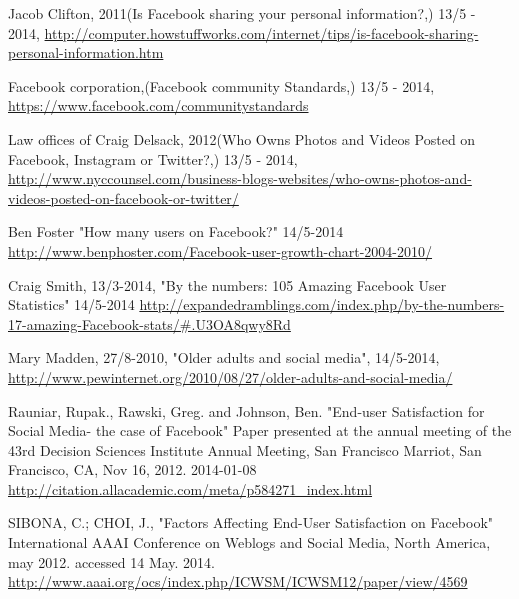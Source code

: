 \documentclass[conference]{IEEEtran}
\begin{document}
\begin{thebibliography}{1}
Jacob Clifton, 2011(Is Facebook sharing your personal information?,) 13/5 - 2014, \href{http://computer.howstuffworks.com/internet/tips/is-facebook-sharing-personal-information.htm}{http://computer.howstuffworks.com/internet/tips/is-facebook-sharing-personal-information.htm}

Facebook corporation,(Facebook community Standards,) 13/5 - 2014, \href{https://www.facebook.com/communitystandards}{https://www.facebook.com/communitystandards}

Law offices of Craig Delsack,
2012(Who Owns Photos and Videos Posted on Facebook, Instagram or Twitter?,) 13/5 - 2014, \href{http://www.nyccounsel.com/business-blogs-websites/who-owns-photos-and-videos-posted-on-facebook-or-twitter/}{http://www.nyccounsel.com/business-blogs-websites/who-owns-photos-and-videos-posted-on-facebook-or-twitter/}




Ben Foster
"How many users on Facebook?"
14/5-2014
\href{http://www.benphoster.com/Facebook-user-growth-chart-2004-2010/}{http://www.benphoster.com/Facebook-user-growth-chart-2004-2010/}

Craig Smith,
13/3-2014,
"By the numbers: 105 Amazing Facebook User Statistics"
14/5-2014
\href{http://expandedramblings.com/index.php/by-the-numbers-17-amazing-Facebook-stats/\#.U3OA8qwy8Rd}{http://expandedramblings.com/index.php/by-the-numbers-17-amazing-Facebook-stats/\#.U3OA8qwy8Rd}

Mary Madden,
27/8-2010,
"Older adults and social media",
14/5-2014,
\href{http://www.pewinternet.org/2010/08/27/older-adults-and-social-media/}{http://www.pewinternet.org/2010/08/27/older-adults-and-social-media/}

Rauniar, Rupak., Rawski, Greg. and Johnson, Ben. "End-user Satisfaction for Social Media- the case of Facebook" Paper presented at the annual meeting of the 43rd Decision Sciences Institute Annual Meeting, San Francisco Marriot, San Francisco, CA, Nov 16, 2012. 2014-01-08 \href{http://citation.allacademic.com/meta/p584271\_index.html}{http://citation.allacademic.com/meta/p584271\_index.html}

SIBONA, C.; CHOI, J.,
"Factors Affecting End-User Satisfaction on Facebook"
International AAAI Conference on Weblogs and Social Media, North America, may 2012.
accessed 14 May. 2014.
\href{http://www.aaai.org/ocs/index.php/ICWSM/ICWSM12/paper/view/4569}{http://www.aaai.org/ocs/index.php/ICWSM/ICWSM12/paper/view/4569}


\end{thebibliography}
\end{document}
